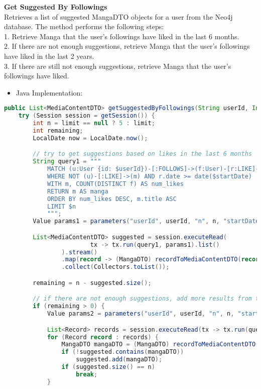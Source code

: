 \textbf{Get Suggested By Followings}\\
Retrieves a list of suggested MangaDTO objects for a user from the Neo4j database.
The method performs the following steps:\\
1. Retrieve Manga that the user's followings have liked in the last 6 months.\\
2. If there are not enough suggestions, retrieve Manga that the user's followings have liked in the last 2 years.\\
3. If there are still not enough suggestions, retrieve Manga that the user's followings have liked.
\begin{itemize}
    \item Java Implementation:
\end{itemize}

\begin{mdframed}[style=customstyle]
\begin{lstlisting}[language=java]
public List<MediaContentDTO> getSuggestedByFollowings(String userId, Integer limit) throws DAOException {
    try (Session session = getSession()) {
        int n = limit == null ? 5 : limit;
        int remaining;
        LocalDate now = LocalDate.now();

        // try to get suggestions based on likes in the last 6 months
        String query1 = """
            MATCH (u:User {id: $userId})-[:FOLLOWS]->(f:User)-[r:LIKE]->(m:Manga)
            WHERE NOT (u)-[:LIKE]->(m) AND r.date >= date($startDate)
            WITH m, COUNT(DISTINCT f) AS num_likes
            RETURN m AS manga
            ORDER BY num_likes DESC, m.title ASC
            LIMIT $n
            """;
        Value params1 = parameters("userId", userId, "n", n, "startDate", now.minusMonths(6));

        List<MediaContentDTO> suggested = session.executeRead(
                        tx -> tx.run(query1, params1).list()
                ).stream()
                .map(record -> (MangaDTO) recordToMediaContentDTO(record))
                .collect(Collectors.toList());

        remaining = n - suggested.size();

        // if there are not enough suggestions, add more results from the last 2 years
        if (remaining > 0) {
            Value params2 = parameters("userId", userId, "n", n, "startDate", now.minusYears(2));

            List<Record> records = session.executeRead(tx -> tx.run(query1, params2).list());
            for (Record record : records) {
                MangaDTO mangaDTO = (MangaDTO) recordToMediaContentDTO(record);
                if (!suggested.contains(mangaDTO))
                    suggested.add(mangaDTO);
                if (suggested.size() == n)
                    break;
            }


\end{lstlisting}
\end{mdframed}
